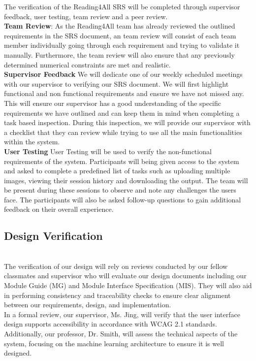 \documentclass[12pt, titlepage]{article}
\begin{document}
The verification of the Reading4All SRS will be completed through supervisor feedback, user testing,
team review and a peer review. \\

\textbf{Team Review}:
As the Reading4All team has already reviewed the outlined requirements in the SRS document, an team review will 
consist of each team member individually going through each requirement and trying to validate it manually. 
Furthermore, the team review will also ensure that any previously determined numerical constraints are met and realistic.  \\


\textbf{Supervisor Feedback}
We will dedicate one of our weekly scheduled meetings with our supervisor to verifying our SRS document. 
We will first highlight functional and non functional requirements and ensure we have not missed any.
This will ensure our supervisor has a good understanding of the specific requirements we have outlined and can keep them in 
mind when completing a task based inspection. During this inspection, we will provide our supervisor with a checklist that they can review while trying to 
use all the main functionalities within the system. \\

\textbf{User Testing}
User Testing will be used to verify the non-functional requirements of the system. Participants will being given access to the system 
and asked to complete a predefined list of tasks such as uploading multiple images, viewing their session history and downloading the output. The team will
be present during these sessions to observe and note any challenges the users face. The participants will also be asked follow-up questions to gain additional feedback on their overall experience. 




\subsection{Design Verification}



\\
The verification of our design will rely on reviews conducted by our fellow classmates and supervisor who will
evaluate our design documents including our Module Guide (MG) and Module Interface Specification (MIS). They will also aid in performing
consistency and traceability checks to ensure clear alignment between our requirements, design, and implementation. \\[1ex]
In a formal review, our supervisor, Ms. Jing, will verify that the user interface design supports accessibility in accordance with WCAG 2.1 standards. 
Additionally, our professor, Dr. Smith, will assess the technical aspects of the system, focusing on the machine learning architecture to ensure it is well designed.
\end{document}

